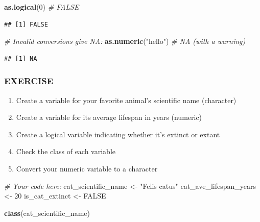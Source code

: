 \documentclass[
]{article}
\newenvironment{Shaded}{\begin{snugshade}}{\end{snugshade}}
\newcommand{\CommentTok}[1]{\textcolor[rgb]{0.56,0.35,0.01}{\textit{#1}}}
\newcommand{\ConstantTok}[1]{\textcolor[rgb]{0.56,0.35,0.01}{#1}}
\newcommand{\DecValTok}[1]{\textcolor[rgb]{0.00,0.00,0.81}{#1}}
\newcommand{\FunctionTok}[1]{\textcolor[rgb]{0.13,0.29,0.53}{\textbf{#1}}}
\newcommand{\NormalTok}[1]{#1}
\newcommand{\OtherTok}[1]{\textcolor[rgb]{0.56,0.35,0.01}{#1}}
\newcommand{\StringTok}[1]{\textcolor[rgb]{0.31,0.60,0.02}{#1}}
\providecommand{\tightlist}{%
  \setlength{\itemsep}{0pt}\setlength{\parskip}{0pt}}
\begin{document}
\begin{Shaded}
\begin{Highlighting}[]
\FunctionTok{as.logical}\NormalTok{(}\DecValTok{0}\NormalTok{)        }\CommentTok{\# FALSE}
\end{Highlighting}
\end{Shaded}

\begin{verbatim}
## [1] FALSE
\end{verbatim}

\begin{Shaded}
\begin{Highlighting}[]
\CommentTok{\# Invalid conversions give NA:}
\FunctionTok{as.numeric}\NormalTok{(}\StringTok{"hello"}\NormalTok{)  }\CommentTok{\# NA (with a warning)}
\end{Highlighting}
\end{Shaded}

\begin{verbatim}
## [1] NA
\end{verbatim}

\subsubsection{EXERCISE}\label{exercise-1}

\begin{enumerate}
\def\labelenumi{\arabic{enumi}.}
\tightlist
\item
  Create a variable for your favorite animal's scientific name
  (character)
\item
  Create a variable for its average lifespan in years (numeric)
\item
  Create a logical variable indicating whether it's extinct or extant
\item
  Check the class of each variable
\item
  Convert your numeric variable to a character
\end{enumerate}

\begin{Shaded}
\begin{Highlighting}[]
\CommentTok{\# Your code here:}
\NormalTok{cat\_scientific\_name }\OtherTok{\textless{}{-}} \StringTok{"Felis catus"}
\NormalTok{cat\_ave\_lifespan\_years }\OtherTok{\textless{}{-}} \DecValTok{20} 
\NormalTok{is\_cat\_extinct }\OtherTok{\textless{}{-}} \ConstantTok{FALSE}

\FunctionTok{class}\NormalTok{(cat\_scientific\_name)}
\end{Highlighting}
\end{Shaded}
\end{document}
